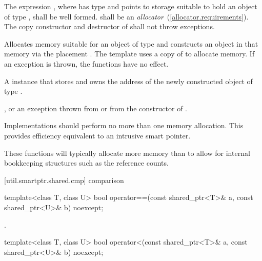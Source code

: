 \begin{itemdescr}
\pnum
\requires The expression ,
where  has type  and points to storage suitable
to hold an object of type , shall be well formed.  shall
be an \textit{allocator}~(\ref{allocator.requirements}). The copy constructor
and destructor of  shall not throw exceptions.

\pnum
\effects Allocates memory suitable for an object of type 
and constructs an object in that memory via the placement
.
The template  uses a copy of  to
allocate memory. If an exception is thrown, the functions have no effect.

\pnum
\returns A  instance that stores and owns
the address of the newly constructed object of type .

\pnum
\postconditions {}

\pnum
\throws {}, or an exception thrown from
 or from the constructor of .

\pnum
\notes Implementations should
perform no more than one memory allocation. \enternote This provides
efficiency equivalent to an intrusive smart pointer. \exitnote

\pnum
\enternote These functions will typically allocate more memory
than  to allow for internal bookkeeping structures such
as the reference counts. \exitnote
\end{itemdescr}

[util.smartptr.shared.cmp]{ comparison}

%
%
\begin{itemdecl}
template<class T, class U> bool operator==(const shared_ptr<T>& a, const shared_ptr<U>& b) noexcept;
\end{itemdecl}

\begin{itemdescr}
\pnum\returns  {}.
\end{itemdescr}

%
%
\begin{itemdecl}
template<class T, class U> bool operator<(const shared_ptr<T>& a, const shared_ptr<U>& b) noexcept;
\end{itemdecl}


